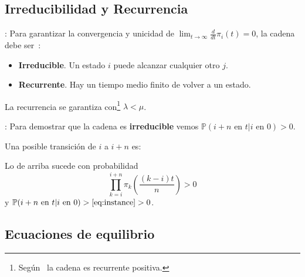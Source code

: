 \documentclass[xcolor={x11names}]{beamer}
\begin{document}
\subsection{Irreducibilidad y Recurrencia}
\begin{frame}{\secname: \subsecname}
    Para garantizar la convergencia
    y unicidad de
    $\lim_{t\to\infty}\tfrac{d}{dt}
    \pi_i(t)=0$,
    la cadena debe ser~\cite{amable}:
    \begin{itemize}
        \item \textbf{Irreducible}.
            Un estado $i$ puede alcanzar
            cualquier otro $j$.
        \item \textbf{Recurrente}.
            Hay un tiempo medio finito
            de volver a un estado.
    \end{itemize}

    \vfill

    La recurrencia se garantiza
    con\footnote{Según~\cite{recurrent}
    la cadena es recurrente positiva.} $\lambda<\mu$.

\end{frame}



\begin{frame}{\secname: \subsecname}
    Para demostrar que la cadena es
    \textbf{irreducible} vemos
    $\mathbb{P}(i+n \text{ en } t
    | i \text{ en } 0)>0$.

    \vfill

    Una posible transición de $i$
    a $i+n$ es:
    
    \begin{figure}
         \resizebox{.8\textwidth}{!}{%
         }
    \end{figure}


    \vfill

    Lo de arriba sucede con probabilidad
    \begin{equation}
        \prod_{k=i}^{i+n} \pi_k\left(
            \frac{(k-i)t}{n}
        \right) > 0
        \label{eq:instance}
    \end{equation}
    y $\mathbb{P}(i+n \text{ en } t
    | i \text{ en } 0)>\eqref{eq:instance}
    >0$.
\end{frame}








\subsection{Ecuaciones de equilibrio}
\end{document}
